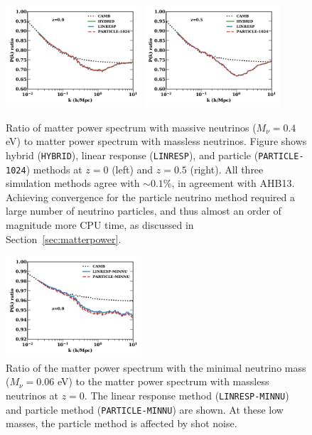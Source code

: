 \documentclass[useAMS, usenatbib]{mnras}
\newcommand{\spb}[1]{{\textcolor{green}{[{\bf SPB}: #1]}}}
\newcommand{\yah}[1]{{\textcolor{blue}{[{\bf YAH}: #1]}}}
\begin{document}
\begin{figure}
\includegraphics[width=0.45\textwidth]{nuplots/pks_rel-10.pdf}
\includegraphics[width=0.45\textwidth]{nuplots/pks_rel-0_66670.pdf}
  \caption{Ratio of matter power spectrum with massive neutrinos ($M_\nu = 0.4$ eV) to matter power spectrum with massless neutrinos. Figure shows hybrid (\texttt{HYBRID}), linear response (\texttt{LINRESP}), and particle (\texttt{PARTICLE-1024}) methods at $z=0$ (left) and $z=0.5$ (right). All three simulation methods agree with $\sim 0.1$\%, %
in agreement with AHB13. Achieving convergence for the particle neutrino method required a large number of neutrino particles, and thus almost an order of magnitude more CPU time, as discussed in Section~\ref{sec:matterpower}.}
  \label{fig:matter_power}
\end{figure}

\begin{figure}
\includegraphics[width=0.45\textwidth]{nuplots/pks_lowmass-10.pdf}
\caption{Ratio of the matter power spectrum with the minimal neutrino mass ($M_\nu = 0.06$ eV) to the matter power spectrum with massless neutrinos at $z=0$. The linear response method (\texttt{LINRESP-MINNU}) and particle method (\texttt{PARTICLE-MINNU}) are shown. At these low masses, the particle method is affected by shot noise. }
\label{fig:minimal_mass}
\end{figure}
\end{document}
